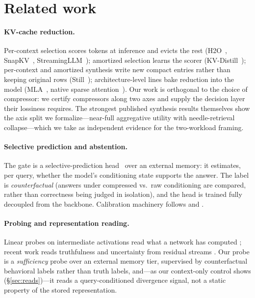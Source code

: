 \documentclass[11pt]{article}
\begin{document}
\section{Related work}

\paragraph{KV-cache reduction.} Per-context selection scores tokens at
inference and evicts the rest (H2O~\citep{zhang2023h2o},
SnapKV~\citep{li2024snapkv}, StreamingLLM~\citep{xiao2024streamingllm});
amortized selection learns the scorer (KV-Distill~\citep{kvdistill2025});
per-context and amortized synthesis write new compact entries rather than
keeping original rows (Still~\citep{oneill2026still}); architecture-level
lines bake reduction into the model (MLA~\citep{deepseekv2}, native sparse
attention~\citep{yuan2025nsa}). Our work is orthogonal to the choice of
compressor: we certify compressors along two axes and supply the decision
layer their lossiness requires. The strongest published synthesis results
themselves show the axis split we formalize---near-full aggregative utility
with needle-retrieval collapse---which we take as independent evidence for
the two-workload framing.

\paragraph{Selective prediction and abstention.} The gate is a
selective-prediction head~\citep{geifman2017selective} over an external
memory: it estimates, per query, whether the model's conditioning state
supports the answer. The label is \emph{counterfactual} (answers under
compressed vs.\ raw conditioning are compared, rather than correctness being
judged in isolation), and the head is trained fully decoupled from the
backbone. Calibration machinery follows \citet{guo2017calibration} and
\citet{platt1999}.

\paragraph{Probing and representation reading.} Linear probes on
intermediate activations read what a network has computed
\citep{alain2017probes}; recent work reads truthfulness and uncertainty
from residual streams \citep{azaria2023internal}. Our probe is a
\emph{sufficiency} probe over an external memory tier, supervised by
counterfactual behavioral labels rather than truth labels, and---as our
context-only control shows (\S\ref{sec:reads})---it reads a
query-conditioned divergence signal, not a static property of the stored
representation.
\end{document}
